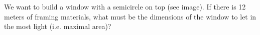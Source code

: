 \begin{minipage}{0.8\textwidth}
	\begin{exercise}
		We want to build a window with a semicircle on top (see image).
		If there is 12 meters of framing materials,
		what must be the dimensions of the window to let in the most light
		(i.e. maximal area)?
	\end{exercise}
\end{minipage}\hfill
